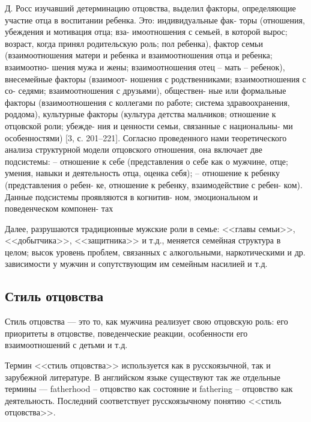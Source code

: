 \documentclass{../../common/thesisbyxetex}
\begin{document}
Д. Росс изучавший детерминацию отцовства,
выделил факторы, определяющие участие отца
в воспитании ребенка. Это: индивидуальные фак-
торы (отношения, убеждения и мотивация отца; вза-
имоотношения с семьей, в которой вырос; возраст,
когда принял родительскую роль; пол ребенка),
фактор семьи (взаимоотношения матери и ребенка
и взаимоотношения отца и ребенка; взаимоотно-
шения мужа и жены; взаимоотношения отец –
мать – ребенок), внесемейные факторы (взаимоот-
ношения с родственниками; взаимоотношения с со-
седями; взаимоотношения с друзьями), обществен-
ные или формальные факторы (взаимоотношения
с коллегами по работе; система здравоохранения,
роддома), культурные факторы (культура детства
мальчиков; отношение к отцовской роли; убежде-
ния и ценности семьи, связанные с национальны-
ми особенностями) [3, с. 201–221].
Согласно проведенного нами теоретического
анализа структурной модели отцовского отношения,
она включает две подсистемы:
– отношение к себе (представления о себе как
о мужчине, отце; умения, навыки и деятельность
отца, оценка себя);
– отношение к ребенку (представления о ребен-
ке, отношение к ребенку, взаимодействие с ребен-
ком).
Данные подсистемы проявляются в когнитив-
ном, эмоциональном и поведенческом компонен-
тах \cite[40]{otage}




Далее, разрушаются традиционные мужские роли в семье: <<главы семьи>>,
<<добытчика>>, <<защитника>> и т.д., меняется семейная структура в целом; высок уровень проблем,
связанных с алкогольными, наркотическими и др. зависимости у мужчин и сопутствующим им семейным
насилией и т.д.









\subsection{Стиль отцовства}

Стиль отцовства --- это то, как мужчина реализует свою отцовскую роль: его приоритеты в отцовстве, 
поведенческие реакции, особенности его взаимоотношений с детьми и т.д.

Термин <<стиль отцовства>> используется как в русскоязычной, так и зарубежной литературе. В 
английском языке существуют так же отдельные термины --- fatherhood -- отцовство как 
состояние и fathering -- отцовство как деятельность. Последний соответствует русскоязычному понятию 
<<стиль отцовства>>.
\end{document}
